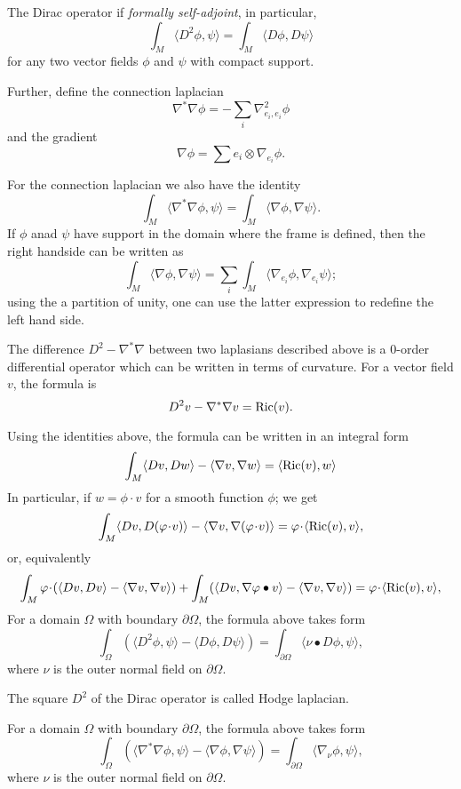The Dirac operator if \emph{formally self-adjoint}, in particular,
\[\int_M \langle D^2\phi,\psi\rangle=\int_M \langle D\phi,D\psi\rangle\]
for any two vector fields $\phi$ and $\psi$ with compact support.

Further, define the connection laplacian
\[\nabla^*\nabla\phi =-\sum_i\nabla^2_{e_i,e_i}\phi\]
and the gradient
\[\nabla \phi=\sum e_i\otimes \nabla_{e_i}\phi.\]

For the connection laplacian we also have the identity
\[\int_M \langle \nabla^*\nabla\phi,\psi\rangle
=
\int_M \langle \nabla\phi,\nabla\psi\rangle.\]
If $\phi$ anad $\psi$ have support in the domain where the frame is defined, then the right handside can be written as 
\[\int_M \langle \nabla\phi,\nabla\psi\rangle=\sum_i\int_M\langle \nabla_{e_i}\phi,\nabla_{e_i}\psi\rangle;\]
using the a partition of unity, one can use the latter expression to redefine the left hand side. 

The difference $D^2-\nabla^*\nabla$ between two laplasians described above is a 0-order differential operator which can be written in terms of curvature.
For a vector field $v$, the formula is 
\[D^2v-\nabla^*\nabla v=\operatorname{Ric}(v).\]

Using the identities above, the formula can be written in an integral form
\[\int_M \langle Dv,Dw\rangle -\langle \nabla v,\nabla w\rangle=\langle \operatorname{Ric}(v),w\rangle\]
In particular, if $w=\phi \cdot v$ for a smooth function $\phi$;
we get
\[\int_M \langle Dv,D(\phi\cdot v)\rangle -\langle \nabla v,\nabla(\phi\cdot v) \rangle=\phi\cdot\langle \Ric(v), v\rangle,\]
or, equivalently
\[\int_M \phi\cdot(\langle Dv,D v\rangle -\langle \nabla v,\nabla v \rangle)
+
\int_M (\langle Dv,\nabla \phi \bullet v\rangle -\langle \nabla v,\nabla v \rangle)
=
\phi\cdot\langle \Ric(v), v\rangle,\]
For a domain $\Omega$ with boundary $\partial \Omega$, the formula above takes form
\[\int_\Omega (\langle D^2\phi,\psi\rangle- \langle D\phi,D\psi\rangle)
=
\int_{\partial \Omega}\langle \nu\bullet D\phi,\psi\rangle,\]
where $\nu$ is the outer normal field on $\partial \Omega$.

The square $D^2$ of the Dirac operator is called Hodge laplacian.


For a domain $\Omega$ with boundary $\partial \Omega$, the formula above takes form
\[\int_\Omega (\langle \nabla^*\nabla\phi,\psi\rangle-\langle \nabla\phi,\nabla\psi\rangle)
=
\int_{\partial \Omega}\langle \nabla_\nu \phi,\psi\rangle,\]
where $\nu$ is the outer normal field on $\partial \Omega$.

